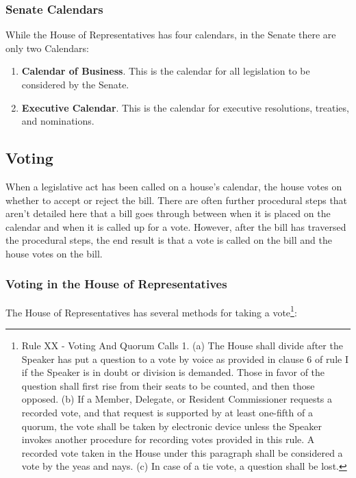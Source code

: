 \subsubsection{Senate Calendars}
While the House of Representatives has four calendars, in the Senate there are only two Calendars:

\begin{enumerate}
\item \textbf{Calendar of Business}.  This is the calendar for all legislation to be considered by the Senate.
\item \textbf{Executive Calendar}. This is the calendar for executive resolutions, treaties, and nominations.
\end{enumerate}

\subsection{Voting}
When a legislative act has been called on a house's calendar, the house votes on whether to accept or reject the bill.  There are often further procedural steps that aren't detailed here that a bill goes through between when it is placed on the calendar and when it is called up for a vote.  However, after the bill has traversed the procedural steps, the end result is that a vote is called on the bill and the house votes on the bill.

\subsubsection{Voting in the House of Representatives}

The House of Representatives has several methods for taking a vote\footnote{Rule XX - Voting And Quorum Calls
1. (a) The House shall divide after the Speaker has put a question to a vote by voice as provided in clause 6 of rule I if the Speaker is in doubt or division is demanded. Those in favor of the question shall first rise from their seats to be counted, and then those opposed. 
(b) If a Member, Delegate, or Resident Commissioner requests a recorded vote, and that request is supported by at least one-fifth of a quorum, the vote shall be taken by electronic device unless the Speaker invokes another procedure for recording votes provided in this rule. A recorded vote taken in the House under this paragraph shall be considered a vote by the yeas and nays. 
(c) In case of a tie vote, a question shall be lost.}:

